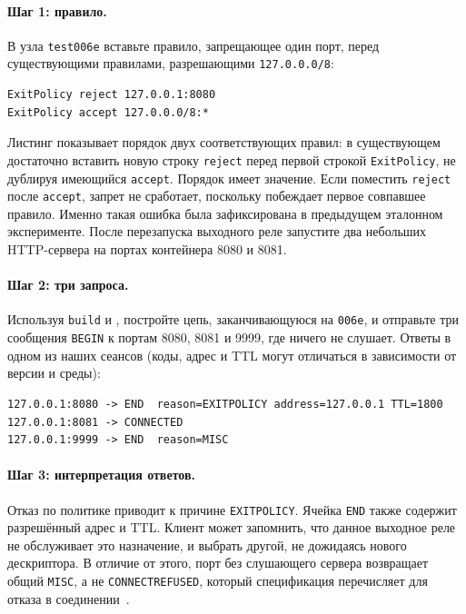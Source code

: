 \paragraph{Шаг 1: правило.} В  узла \texttt{test006e} вставьте правило, запрещающее один порт, перед существующими правилами, разрешающими \texttt{127.0.0.0/8}:
\begin{lstlisting}[numbers=none]
ExitPolicy reject 127.0.0.1:8080
ExitPolicy accept 127.0.0.0/8:*
\end{lstlisting}
Листинг показывает порядок двух соответствующих правил: в существующем  достаточно вставить новую строку \texttt{reject} перед первой строкой \texttt{ExitPolicy}, не дублируя имеющийся \texttt{accept}. Порядок имеет значение. Если поместить \texttt{reject} после \texttt{accept}, запрет не сработает, поскольку побеждает первое совпавшее правило. Именно такая ошибка была зафиксирована в предыдущем эталонном эксперименте. После перезапуска выходного реле запустите два небольших HTTP-сервера на портах контейнера 8080 и 8081.

\paragraph{Шаг 2: три запроса.} Используя \texttt{build} и , постройте цепь, заканчивающуюся на \texttt{006e}, и отправьте три сообщения \texttt{BEGIN} к портам 8080, 8081 и 9999, где ничего не слушает. Ответы в одном из наших сеансов (коды, адрес и TTL могут отличаться в зависимости от версии и среды):
\begin{lstlisting}[numbers=none]
127.0.0.1:8080 -> END  reason=EXITPOLICY address=127.0.0.1 TTL=1800
127.0.0.1:8081 -> CONNECTED
127.0.0.1:9999 -> END  reason=MISC
\end{lstlisting}

\paragraph{Шаг 3: интерпретация ответов.} Отказ по политике приводит к причине \texttt{EXITPOLICY}. Ячейка \texttt{END} также содержит разрешённый адрес и TTL. Клиент может запомнить, что данное выходное реле не обслуживает это назначение, и выбрать другой, не дожидаясь нового дескриптора. В отличие от этого, порт без слушающего сервера возвращает общий \texttt{MISC}, а не \texttt{CONNECTREFUSED}, который спецификация перечисляет для отказа в соединении~.

